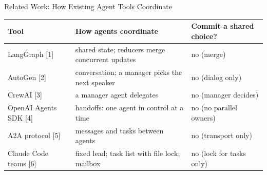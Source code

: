 \documentclass[aspectratio=169,11pt]{beamer}
\begin{document}
\begin{frame}{Related Work: How Existing Agent Tools Coordinate}
  \scriptsize
  \begin{tabular}{p{3.3cm}p{6.3cm}p{4.0cm}}
    \toprule
    Tool & How agents coordinate & Commit a shared choice? \\
    \midrule
    LangGraph [1] & shared state; reducers merge concurrent updates & no (merge) \\
    \leavevmode\pause AutoGen [2] & conversation; a manager picks the next speaker & no (dialog only) \\
    \leavevmode\pause CrewAI [3] & a manager agent delegates & no (manager decides) \\
    \leavevmode\pause OpenAI Agents SDK [4] & handoffs: one agent in control at a time & no (no parallel owners) \\
    \leavevmode\pause A2A protocol [5] & messages and tasks between agents & no (transport only) \\
    \leavevmode\pause Claude Code teams [6] & fixed lead; task list with file lock; mailbox & no (lock for tasks only) \\
    \bottomrule
  \end{tabular}


\end{frame}
\end{document}
